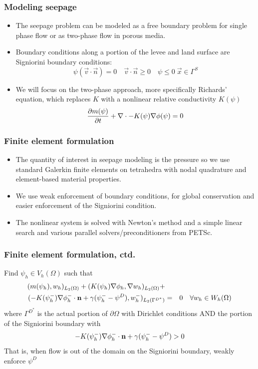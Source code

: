 \documentclass{beamer}
\begin{document}
\begin{frame}
  \frametitle{Modeling seepage}
  \begin{itemize}
    \item The seepage problem can be modeled as a free boundary
      problem for single phase flow or as two-phase flow in porous
      media.
    \item Boundary conditions along a portion of the
      levee and land surface are Signiorini boundary conditions:
      \begin{equation}
\psi(\vec v \cdot \vec n) = 0 \quad \vec v \cdot \vec n \geq 0 \quad
\psi \leq 0 \; \vec x \in \Gamma^{S}
      \end{equation}
    \item We will focus on the two-phase approach, more specifically
      Richards' equation, which replaces $K$ with a nonlinear relative
      conductivity $K(\psi)$
      \begin{equation}
        \frac{\partial {m(\psi)}}{\partial {t}} + \nabla \cdot -K(\psi) \nabla \phi(\psi) = 0 
      \end{equation}
  \end{itemize}
\end{frame}

\begin{frame}
  \frametitle{Finite element formulation}
  \begin{itemize}
  \item The quantity of interest in seepage modeling is the pressure
    so we use standard Galerkin finite elements on tetrahedra with
    nodal quadrature and element-based material properties.
  \item We use weak enforcement of boundary conditions, for global
    conservation and easier enforcement of the Signiorini condition.
  \item The nonlinear system is solved with Newton's method and a
    simple linear search and various parallel solvers/preconditioners
    from PETSc.
  \end{itemize}
\end{frame}

\begin{frame}
\frametitle{Finite element formulation, ctd.}
Find $\psi_h \in V_h(\Omega)$ such that
\begin{eqnarray}
  (m(\psi_h),w_h)_{L_2(\Omega)} + (K(\psi_h)\nabla \phi_h,\nabla w_h)_{L_2(\Omega)} + && \\
(-K(\psi_h^-) \nabla \phi_h^- \cdot {\bf n} + \gamma (\psi_h^- - \psi^D),w_h^-)_{L_2(\Gamma^{D^*})} &=& 0 \quad \forall w_h \in W_h(\Omega)  \nonumber
\end{eqnarray}
where $\Gamma^{D^*}$ is the actual portion of $\partial \Omega$ with
Dirichlet conditions AND the portion of the Signiorini boundary with
\begin{equation}
-K(\psi_h^-) \nabla \phi_h^- \cdot {\bf n} + \gamma (\psi_h^-  - \psi^D) > 0
\end{equation}
That is, when flow is out of the domain on the Signiorini boundary, weakly enforce $\psi^D$
\end{frame}
\end{document}
